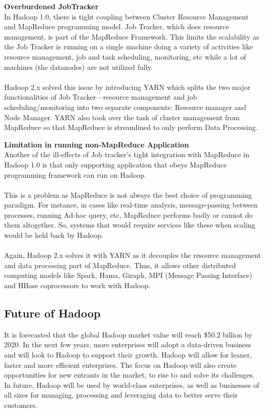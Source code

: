 \documentclass[a4paper,12pt,oneside]{report}
\begin{document}
\textbf{Overburdened JobTracker}\\
In Hadoop 1.0, there is tight coupling between Cluster Resource Management and MapReduce programming model. 
Job Tracker, which does resource management, is part of the MapReduce Framework. 
This limits the scalability as the Job Tracker is running on a single machine doing a variety of activities like 
resource management, job and task scheduling, monitoring, etc while a lot of machines (the datanodes) are not utilized fully.\\
\\
Hadoop 2.x solved this issue by introducing YARN which splits the two major functionalities of Job Tracker—resource 
management and job scheduling/monitoring into two separate components: Resource manager and Node Manager. 
YARN also took over the task of cluster management from MapReduce so that MapReduce is streamlined to only perform Data Processing.

\textbf{Limitation in running non-MapReduce Application}\\
Another of the ill-effects of Job tracker’s tight integration with MapReduce in Hadoop 1.0 is that only supporting application 
that obeys MapReduce programming framework can run on Hadoop.\\ 
\\
This is a problem as MapReduce is not always the best choice of programming paradigm. 
For instance, in cases like real-time analysis, message-passing between processes, running Ad-hoc query, etc, 
MapReduce performs badly or cannot do them altogether. So, systems that would require services like these when scaling 
would be held back by Hadoop.\\ 
\\
Again, Hadoop 2.x solves it with YARN as it decouples the resource management and data processing part of MapReduce. 
Thus, it allows other distributed computing models like Spark, Hama, Giraph, MPI (Message Passing Interface) and HBase 
coprocessors to work with Hadoop. 

\subsection{Future of Hadoop}

It is forecasted that the global Hadoop market value will reach \$50.2 billion 
by 2020. In the next few years, more enterprises will adopt a data-driven 
business and will look to Hadoop to support their growth. Hadoop will allow 
for leaner, faster and more efficient enterprises. The focus on Hadoop will 
also create opportunities for new entrants in the market, to rise to and solve 
its challenges. In future, Hadoop will be used by world-class enterprises, 
as well as businesses of all sizes for managing, processing and leveraging 
data to better serve their customers.
\end{document}
